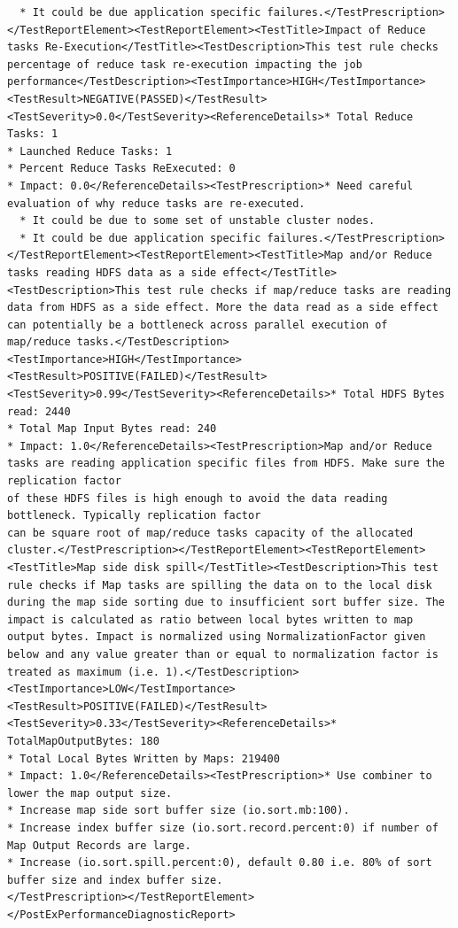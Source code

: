 \begin{lstlisting}
  * It could be due application specific failures.</TestPrescription></TestReportElement><TestReportElement><TestTitle>Impact of Reduce tasks Re-Execution</TestTitle><TestDescription>This test rule checks percentage of reduce task re-execution impacting the job performance</TestDescription><TestImportance>HIGH</TestImportance>
<TestResult>NEGATIVE(PASSED)</TestResult>
<TestSeverity>0.0</TestSeverity><ReferenceDetails>* Total Reduce Tasks: 1
* Launched Reduce Tasks: 1
* Percent Reduce Tasks ReExecuted: 0
* Impact: 0.0</ReferenceDetails><TestPrescription>* Need careful evaluation of why reduce tasks are re-executed.
  * It could be due to some set of unstable cluster nodes.
  * It could be due application specific failures.</TestPrescription></TestReportElement><TestReportElement><TestTitle>Map and/or Reduce tasks reading HDFS data as a side effect</TestTitle><TestDescription>This test rule checks if map/reduce tasks are reading data from HDFS as a side effect. More the data read as a side effect can potentially be a bottleneck across parallel execution of map/reduce tasks.</TestDescription><TestImportance>HIGH</TestImportance>
<TestResult>POSITIVE(FAILED)</TestResult>
<TestSeverity>0.99</TestSeverity><ReferenceDetails>* Total HDFS Bytes read: 2440
* Total Map Input Bytes read: 240
* Impact: 1.0</ReferenceDetails><TestPrescription>Map and/or Reduce tasks are reading application specific files from HDFS. Make sure the replication factor
of these HDFS files is high enough to avoid the data reading bottleneck. Typically replication factor
can be square root of map/reduce tasks capacity of the allocated cluster.</TestPrescription></TestReportElement><TestReportElement><TestTitle>Map side disk spill</TestTitle><TestDescription>This test rule checks if Map tasks are spilling the data on to the local disk during the map side sorting due to insufficient sort buffer size. The impact is calculated as ratio between local bytes written to map output bytes. Impact is normalized using NormalizationFactor given below and any value greater than or equal to normalization factor is treated as maximum (i.e. 1).</TestDescription><TestImportance>LOW</TestImportance>
<TestResult>POSITIVE(FAILED)</TestResult>
<TestSeverity>0.33</TestSeverity><ReferenceDetails>* TotalMapOutputBytes: 180
* Total Local Bytes Written by Maps: 219400
* Impact: 1.0</ReferenceDetails><TestPrescription>* Use combiner to lower the map output size.
* Increase map side sort buffer size (io.sort.mb:100).
* Increase index buffer size (io.sort.record.percent:0) if number of Map Output Records are large.
* Increase (io.sort.spill.percent:0), default 0.80 i.e. 80% of sort buffer size and index buffer size.
</TestPrescription></TestReportElement></PostExPerformanceDiagnosticReport>
\end{lstlisting}
